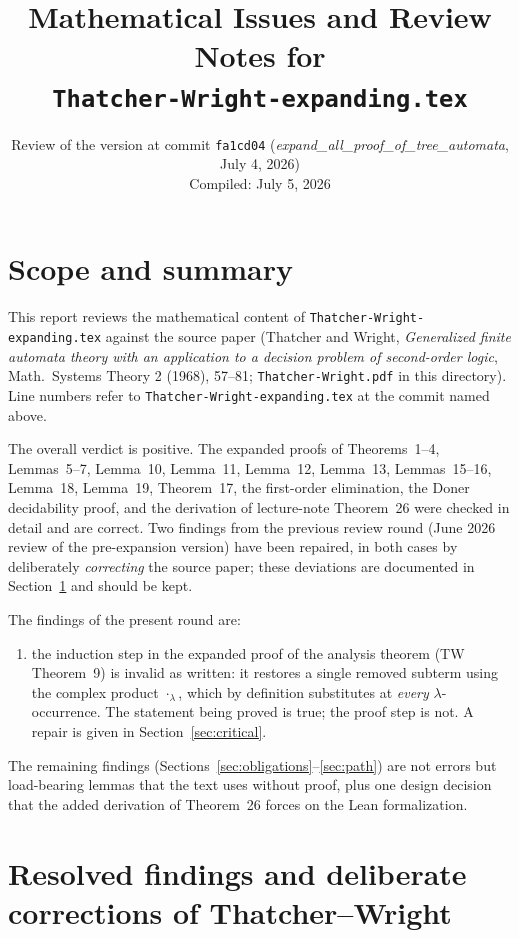 \documentclass[11pt]{article}
\title{Mathematical Issues and Review Notes for\\
  \texttt{Thatcher-Wright-expanding.tex}}
\author{}
\date{Review of the version at commit \texttt{fa1cd04}
  (\emph{expand\_all\_proof\_of\_tree\_automata}, July 4, 2026)\\
  Compiled: July 5, 2026}
\newcommand{\TW}{Thatcher--Wright}
\begin{document}
\maketitle

\section*{Scope and summary}

This report reviews the mathematical content of
\texttt{Thatcher-Wright-expanding.tex} against the source paper (Thatcher and
Wright, \emph{Generalized finite automata theory with an application to a
decision problem of second-order logic}, Math.\ Systems Theory 2 (1968),
57--81; \texttt{Thatcher-Wright.pdf} in this directory).  Line numbers refer to
\texttt{Thatcher-Wright-expanding.tex} at the commit named above.

The overall verdict is positive.  The expanded proofs of Theorems~1--4,
Lemmas~5--7, Lemma~10, Lemma~11, Lemma~12, Lemma~13, Lemmas~15--16, Lemma~18,
Lemma~19, Theorem~17, the first-order elimination, the Doner decidability
proof, and the derivation of lecture-note Theorem~26 were checked in detail and
are correct.  Two findings from the previous review round (June 2026 review of
the pre-expansion version) have been repaired, in both cases by deliberately
\emph{correcting} the source paper; these deviations are documented in
Section~\ref{sec:resolved} and should be kept.

The findings of the present round are:
\begin{enumerate}[label=\textbf{C\arabic*.},leftmargin=*]
  \item the induction step in the expanded proof of the analysis theorem
    (TW Theorem~9) is invalid as written: it restores a single removed subterm
    using the complex product \(\cdot_\lambda\), which by definition
    substitutes at \emph{every} \(\lambda\)-occurrence.  The statement being
    proved is true; the proof step is not.  A repair is given in
    Section~\ref{sec:critical}.
\end{enumerate}
The remaining findings (Sections~\ref{sec:obligations}--\ref{sec:path}) are not
errors but load-bearing lemmas that the text uses without proof, plus one
design decision that the added derivation of Theorem~26 forces on the Lean
formalization.

\section{Resolved findings and deliberate corrections of \TW{}}
\label{sec:resolved}
\end{document}
